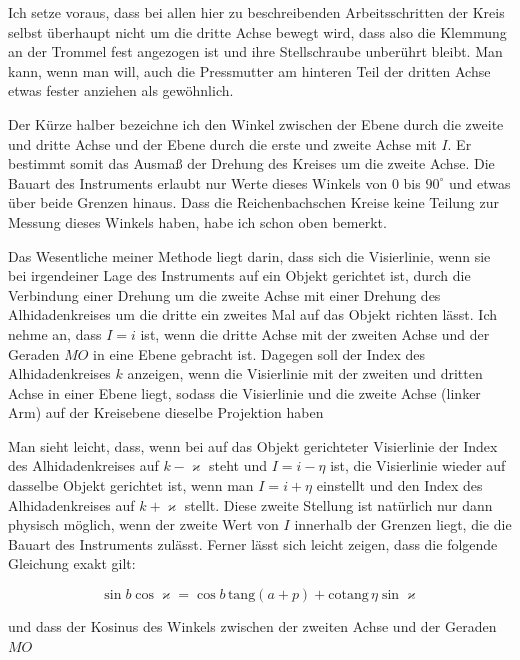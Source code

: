 \par\indent Ich setze voraus, dass bei allen hier zu beschreibenden Arbeitsschritten der Kreis selbst überhaupt nicht um die dritte Achse bewegt wird, dass also die Klemmung an der Trommel fest angezogen ist und ihre Stellschraube unberührt bleibt. Man kann, wenn man will, auch die Pressmutter am hinteren Teil der dritten Achse etwas fester anziehen als gewöhnlich.

\par\indent Der Kürze halber bezeichne ich den Winkel zwischen der Ebene durch die zweite und dritte Achse und der Ebene durch die erste und zweite Achse mit $I$. Er bestimmt somit das Ausmaß der Drehung des Kreises um die zweite Achse. Die Bauart des Instruments erlaubt nur Werte dieses Winkels von $0$ bis $90^\circ$ und etwas über beide Grenzen hinaus. Dass die Reichenbachschen Kreise keine Teilung zur Messung dieses Winkels haben, habe ich schon oben bemerkt.

\par\indent Das Wesentliche meiner Methode liegt darin, dass sich die Visierlinie, wenn sie bei irgendeiner Lage des Instruments auf ein Objekt gerichtet ist, durch die Verbindung einer Drehung um die zweite Achse mit einer Drehung des Alhidadenkreises um die dritte ein zweites Mal auf das Objekt richten lässt. Ich nehme an, dass $I = i$ ist, wenn die dritte Achse mit der zweiten Achse und der Geraden $MO$ in eine Ebene gebracht ist. Dagegen soll der Index des Alhidadenkreises $k$ anzeigen, wenn die Visierlinie mit der zweiten und dritten Achse in einer Ebene liegt, sodass die Visierlinie und die zweite Achse (linker Arm) auf der Kreisebene dieselbe Projektion haben

\par\indent Man sieht leicht, dass, wenn bei auf das Objekt gerichteter Visierlinie der Index des Alhidadenkreises auf $k-\varkappa$ steht und $I=i-\eta$ ist, die Visierlinie wieder auf dasselbe Objekt gerichtet ist, wenn man $I=i+\eta$ einstellt und den Index des Alhidadenkreises auf $k+\varkappa$ stellt. Diese zweite Stellung ist natürlich nur dann physisch möglich, wenn der zweite Wert von $I$ innerhalb der Grenzen liegt, die die Bauart des Instruments zulässt. Ferner lässt sich leicht zeigen, dass die folgende Gleichung exakt gilt:

\[ \sin b \cos\varkappa = \cos b\, \mathrm{tang}(a+p) + \mathrm{cotang}\,\eta \sin\varkappa \]

\noindent und dass der Kosinus des Winkels zwischen der zweiten Achse und der Geraden $MO$

